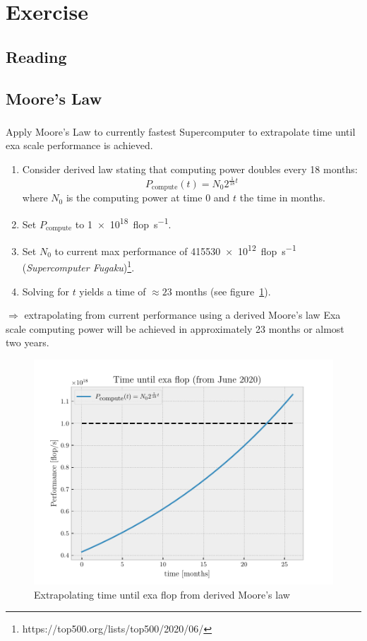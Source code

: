 \documentclass[]{scrartcl}
\newcommand{\exercise}{Exercise \thesection}
\begin{document}
\section*{\exercise}
\subsection{Reading}
\subsection{Moore's Law}
\subsubsection{}
Apply Moore's Law to currently fastest Supercomputer to extrapolate time until exa
scale performance is achieved.
\begin{enumerate}
	\item Consider derived law stating that computing power doubles every 18 months:
	\begin{equation}
		P_{\textrm{compute}}(t) = N_0 2^{\frac{1}{18} t}
	\end{equation}
	where $ N_0 $ is the computing power at time 0 and $ t $ the time in months.
	\item Set $ P_{\textrm{compute}} $ to \SI{1e18}{flop\per\second}.
	\item Set $ N_0 $ to current max performance of \SI{415530e12}{flop\per\second}
	(\emph{Supercomputer Fugaku})\footnote{https://top500.org/lists/top500/2020/06/}.
\item Solving for $ t $ yields a time of $ \approx23 $ months (see figure~\ref{fig:Moore}).
\end{enumerate}
$ \Rightarrow $ extrapolating from current performance using a derived Moore's law
Exa scale computing power will be achieved in approximately 23 months or almost two years.
\begin{figure}[htpb]
	\centering
	\includegraphics[width=0.8\linewidth]{./plots/Moore}
	\caption{Extrapolating time until exa flop from derived Moore's law}%
	\label{fig:Moore}
\end{figure}
\end{document}
